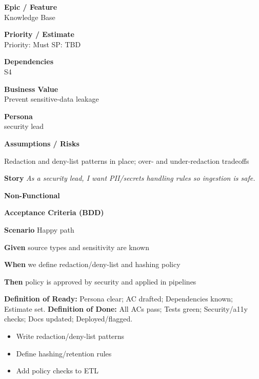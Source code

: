 \documentclass[11pt,a4paper]{article}
\newenvironment{StoryCard}[2][]{
  \begin{tcolorbox}[enhanced, breakable, sharp corners=all, colback=cardback, colframe=cardframe,
    title={#2}, fonttitle=\bfseries\large, boxrule=0.6pt, borderline west={2pt}{0pt}{accent}, #1]
}{
  \end{tcolorbox}
}
\newcommand{\badge}[1]{\pill{\footnotesize #1}}
\newcommand{\cb}{\(\square\)}
\newenvironment{TasksBox}[1][Tasks]{%
  \begin{tcolorbox}[enhanced,breakable,
    colback=cardback, colframe=cardframe, title={#1},
    borderline west={1.8pt}{0pt}{MidnightBlue},
    arc=2pt, boxrule=0.4pt,
    left=10pt,right=10pt,top=6pt,bottom=6pt,
    before skip=6pt, after skip=10pt
  ]
  \small
  \begin{itemize}[label=\cb, leftmargin=*, labelsep=0.6em, itemsep=4pt, topsep=2pt, parsep=0pt]
}{%
  \end{itemize}
  \end{tcolorbox}
}
\begin{document}
\begin{StoryCard}{S5 — PII/Secrets policy for corp content}
\noindent\begin{minipage}[t]{0.49\textwidth}
\textbf{Epic / Feature}\\
Knowledge Base

\medskip
\textbf{Priority / Estimate}\\
Priority: Must \quad SP: TBD

\medskip
\textbf{Dependencies}\\
S4
\end{minipage}\hfill
\begin{minipage}[t]{0.49\textwidth}
\textbf{Business Value}\\
Prevent sensitive-data leakage

\medskip
\textbf{Persona}\\
security lead

\medskip
\textbf{Assumptions / Risks}\par
Redaction and deny-list patterns in place; over- and under-redaction tradeoffs
\end{minipage}

\medskip
\textbf{Story} \emph{As a security lead, I want PII/secrets handling rules so ingestion is safe.}

\medskip
\textbf{Non-Functional}
\badge{Security}\ \badge{Privacy}

\medskip
\textbf{Acceptance Criteria (BDD)}\par
\textbf{Scenario} Happy path\par
\textbf{Given} source types and sensitivity are known\par
\textbf{When} we define redaction/deny-list and hashing policy\par
\textbf{Then} policy is approved by security and applied in pipelines\par
\medskip
\footnotesize \textbf{Definition of Ready:} Persona clear; AC drafted; Dependencies known; Estimate set.\quad
\textbf{Definition of Done:} All ACs pass; Tests green; Security/a11y checks; Docs updated; Deployed/flagged.
\end{StoryCard}

\begin{TasksBox}[Tasks]
  \item Write redaction/deny-list patterns
  \item Define hashing/retention rules
  \item Add policy checks to ETL
\end{TasksBox}
\clearpage
\end{document}
